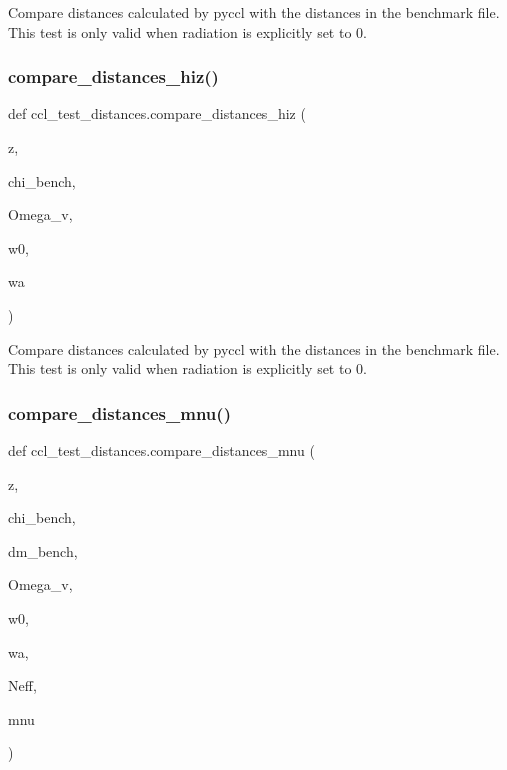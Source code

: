 \begin{DoxyVerb}Compare distances calculated by pyccl with the distances in the benchmark
file.
This test is only valid when radiation is explicitly set to 0.
\end{DoxyVerb}
 \mbox{\label{namespaceccl__test__distances_a73d0450ebec8e25f65fb0c27498f7acd}} 
\subsubsection{\texorpdfstring{compare\+\_\+distances\+\_\+hiz()}{compare\_distances\_hiz()}}
{\footnotesize\ttfamily def ccl\+\_\+test\+\_\+distances.\+compare\+\_\+distances\+\_\+hiz (\begin{DoxyParamCaption}\item[{}]{z,  }\item[{}]{chi\+\_\+bench,  }\item[{}]{Omega\+\_\+v,  }\item[{}]{w0,  }\item[{}]{wa }\end{DoxyParamCaption})}

\begin{DoxyVerb}Compare distances calculated by pyccl with the distances in the benchmark
file.
This test is only valid when radiation is explicitly set to 0.
\end{DoxyVerb}
 \mbox{\label{namespaceccl__test__distances_a0cce8b8b66ddb4e327b1905ca907bb59}} 
\subsubsection{\texorpdfstring{compare\+\_\+distances\+\_\+mnu()}{compare\_distances\_mnu()}}
{\footnotesize\ttfamily def ccl\+\_\+test\+\_\+distances.\+compare\+\_\+distances\+\_\+mnu (\begin{DoxyParamCaption}\item[{}]{z,  }\item[{}]{chi\+\_\+bench,  }\item[{}]{dm\+\_\+bench,  }\item[{}]{Omega\+\_\+v,  }\item[{}]{w0,  }\item[{}]{wa,  }\item[{}]{Neff,  }\item[{}]{mnu }\end{DoxyParamCaption})}

